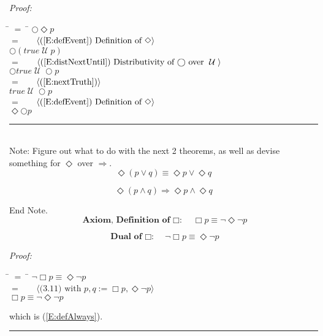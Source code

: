 \documentclass[fleqn, leqno]{article}
\newcommand{\lgap}{2pt}                             %
\newcommand{\mymathindent}{24pt}                      %
\newcommand{\until}{\;\mathcal{U}\;}
\newcommand{\next}{\bigcirc}
\newcommand{\event}{\Diamond}
\newcommand{\always}{\Box}
\newcommand{\myqed}{\hfill\rule[-.23ex]{1.2ex}{2.0ex}}
\newcommand{\Gll} {\langle}                         %
\newcommand{\Ggg} {\rangle}                         %
\newcommand{\Hint}[1]     {\ \ \ $\Gll              \mbox{#1} \Ggg$ }   %
\begin{document}
\emph{Proof:}
\begin{tabbing}
\hspace{\mymathindent} \= $= \;$ \= \kill
  \> \>   $\next\event p$\\[\lgap]
  \> $=$  \>  \Hint{(\ref{E:defEvent}) Definition of $\event$}\\[\lgap]
  \> \>   $\next(true \until p)$\\[\lgap]
  \> $=$  \>  \Hint{(\ref{E:distNextUntil}) Distributivity of $\next$ over $\until$}\\[\lgap]
  \> \>   $\next true \until \next p$\\[\lgap]
  \> $=$  \>  \Hint{(\ref{E:nextTruth})}\\[\lgap]
  \> \>   $true \until \next p$\\[\lgap]
  \> $=$  \>  \Hint{(\ref{E:defEvent}) Definition of $\event$}\\[\lgap]
  \> \>   $\event\next p$\\[\lgap]
\end{tabbing}
\myqed\\[\lgap]

Note: Figure out what to do with the next 2 theorems, as well as devise something for $\event$ over $\Rightarrow$.\\

\begin{equation}\label{E:distEventOr}
\event(p \lor q) \equiv \event p \lor \event q
\end{equation}

\begin{equation}\label{E:distEventAnd}
\event(p \land q) \Rightarrow \event p \land \event q
\end{equation}

End Note.\\

\begin{equation}\label{E:defAlways}
\textbf{Axiom, Definition of $\always$:}\quad \always p \equiv \lnot\event\lnot p
\end{equation}

\begin{equation}\label{E:dualAlways}
\textbf{Dual of $\always$:}\quad \lnot\always p \equiv \event\lnot p
\end{equation}

\emph{Proof:}
\begin{tabbing}
\hspace{\mymathindent} \= $= \;$ \= \kill
  \> \>   $\lnot\always p \equiv \event\lnot p$\\[\lgap]
  \> $=$  \>  \Hint{(3.11) with $p,q := \always p, \event\lnot p$}\\[\lgap]
  \> \>   $\always p \equiv \lnot\event\lnot p$
\end{tabbing}
which is (\ref{E:defAlways}). \myqed\\[\lgap]
\end{document}
